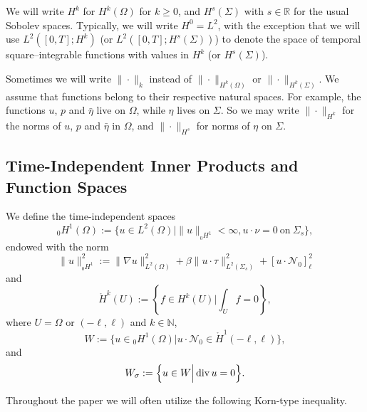 \documentclass[letterpaper,reqno,10pt,twoside]{amsart}
\theoremstyle{definition}
\theoremstyle{remark}
\def\Om{\Omega}
\def\dive{\mathop{\rm div}\nolimits}
\begin{document}
	We will write $H^k$ for $H^k(\Om)$ for $k\ge0$, and $H^s(\Sigma)$ with $s\in\mathbb{R}$ for the usual Sobolev spaces. Typically, we will write $H^0=L^2$, with the exception that we will use $L^2([0,T];H^k)$ (or $L^2([0,T];H^s(\Sigma))$) to denote the space of temporal square--integrable functions with values in $H^k$ (or $H^s(\Sigma)$).
	
	Sometimes we will write $\|\cdot\|_k$ instead of $\|\cdot\|_{H^k(\Om)}$ or $\|\cdot\|_{H^k(\Sigma)}$. We assume that functions belong to their respective natural spaces. For example, the functions $u$, $p$ and $\bar{\eta}$ live on $\Om$, while $\eta$ lives on $\Sigma$. So we may write $\|\cdot\|_{H^k}$ for the norms of $u$, $p$ and $\bar{\eta}$ in $\Om$, and $\|\cdot\|_{H^s}$ for norms of $\eta$ on $\Sigma$.
	
	
	\subsection{Time-Independent Inner Products and Function Spaces}
	
	
	We define the time-independent spaces
	\[
	{}_0H^1(\Om):=\Big\{u\in L^2(\Om)\Big|\|u\|_{{}_0H^1}<\infty, u\cdot\nu=0\ \text{on}\ \Sigma_s\Big\},
	\]
	endowed with the norm 
	\[\|u\|_{{}_0H^1}^{2}:=\|\nabla u\|_{L^{2}(\Omega)}^{2}+\beta\|u\cdot \tau\|^{2}_{L^{2}(\Sigma_{s})}+[u\cdot \mathcal{N}_{0}]_{\ell}^2\]
	and 
	\[
	\mathring{H}^k(U):=\left\{f\in H^k(U)\Big| \int_Uf=0\right\},
	\]
	where $U=\Om$ or $(-\ell, \ell)$ and $k\in\mathbb{N}$,
	\[
	W:=\Big\{u\in{}_0H^1(\Om)\Big|u\cdot\mathcal{N}_0\in \mathring{H}^1(-\ell, \ell)\Big\},
	\]
	and
	\[
	W_\sigma:=\Big\{u\in W\Big| \dive u=0\Big\}.
	\]
	
	Throughout the paper we will often utilize the following Korn-type inequality. 
	
\end{document}
